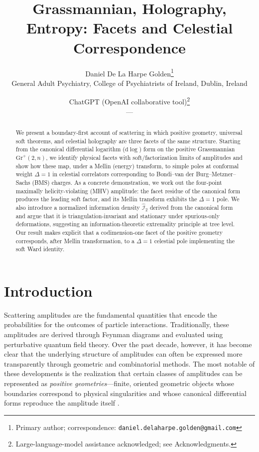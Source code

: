 \documentclass[11pt]{article}
\begin{document}
\title{Grassmannian, Holography, Entropy: Facets and Celestial Correspondence}

\author{Daniel De La Harpe Golden\thanks{Primary author; correspondence: \texttt{daniel.delaharpe.golden@gmail.com}}\\
\small General Adult Psychiatry, College of Psychiatrists of Ireland, Dublin, Ireland
\and
ChatGPT (OpenAI collaborative tool)\thanks{Large-language-model assistance acknowledged; see Acknowledgments.}\\
\small ---
}

\date{} %

\maketitle

\begin{abstract}
We present a boundary-first account of scattering in which positive geometry, universal soft theorems, and celestial holography are three facets of the same structure. Starting from the canonical differential logarithm ($\mathrm{d}\!\log$) form on the positive Grassmannian $\mathrm{Gr}^+(2,n)$, we identify physical facets with soft/factorization limits of amplitudes and show how these map, under a Mellin (energy) transform, to simple poles at conformal weight $\Delta=1$ in celestial correlators corresponding to Bondi--van der Burg--Metzner--Sachs (BMS) charges. As a concrete demonstration, we work out the four-point maximally helicity-violating (MHV) amplitude: the facet residue of the canonical form produces the leading soft factor, and its Mellin transform exhibits the $\Delta=1$ pole. We also introduce a normalized information density $\widehat{\mathcal I}_2$ derived from the canonical form and argue that it is triangulation-invariant and stationary under spurious-only deformations, suggesting an information-theoretic extremality principle at tree level. Our result makes explicit that a codimension-one facet of the positive geometry corresponds, after Mellin transformation, to a $\Delta=1$ celestial pole implementing the soft Ward identity.
\end{abstract}

\section{Introduction}
Scattering amplitudes are the fundamental quantities that encode the probabilities for the outcomes of particle interactions. Traditionally, these amplitudes are derived through Feynman diagrams and evaluated using perturbative quantum field theory. Over the past decade, however, it has become clear that the underlying structure of amplitudes can often be expressed more transparently through geometric and combinatorial methods. The most notable of these developments is the realization that certain classes of amplitudes can be represented as \emph{positive geometries}---finite, oriented geometric objects whose boundaries correspond to physical singularities and whose canonical differential forms reproduce the amplitude itself \citep{ArkaniHamedBaiLam2017}.
\end{document}
